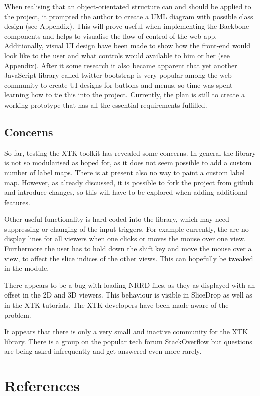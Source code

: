 \documentclass[a4paper,11pt,titlepage]{article}
\begin{document}
When realising that an object-orientated structure can and should be applied to the project, it prompted the author to create a UML diagram with possible class design (see Appendix). This will prove useful when implementing the Backbone components and helps to visualise the flow of control of the web-app. Additionally, visual UI design have been made to show how the front-end would look like to the user and what controls would available to him or her (see Appendix). After it some research it also became apparent that yet another JavaScript library called twitter-bootstrap is very popular among the web community to create UI designs for buttons and menus, so time was spent learning how to tie this into the project.
Currently, the plan is still to create a working prototype that has all the essential requirements fulfilled.


\subsection{Concerns}

So far, testing the XTK toolkit has revealed some concerns. In general the library is not so modularised as hoped for, as it does not seem possible to add a custom number of label maps. There is at present also no way to paint a custom label map. However, as already discussed, it is possible to fork the project from github and introduce changes, so this will have to be explored when adding additional features.

Other useful functionality is hard-coded into the library, which may need suppressing or changing of the input triggers. For example currently, the are no display lines for all viewers when one clicks or moves the mouse over one view. Furthermore the user has to hold down the shift key and move the mouse over a view, to affect the slice indices of the other views. This can hopefully be tweaked in the module.

There appears to be a bug with loading NRRD files, as they as displayed with an offset in the 2D and 3D viewers. This behaviour is visible in SliceDrop as well as in the XTK tutorials. The XTK developers have been made aware of the problem.

It appears that there is only a very small and inactive community for the XTK library. There is a group on the popular tech forum StackOverflow but questions are being asked infrequently and get answered even more rarely. 




\section{References}
\end{document}
